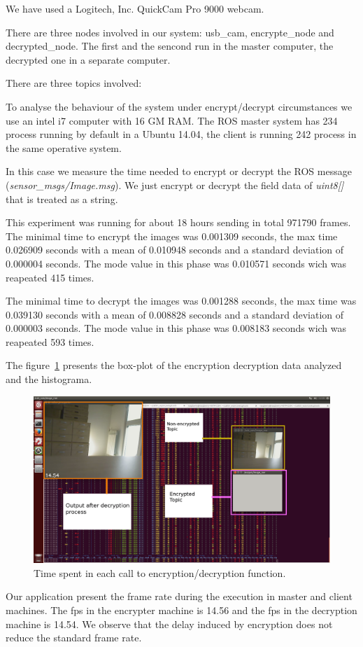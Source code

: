 \documentclass[journal,twoside]{JoPhA}
\begin{document}
We have used a Logitech, Inc. QuickCam Pro 9000 webcam.

There are three nodes involved in our system: usb\_cam, encrypte\_node and decrypted\_node. The first and the sencond run in the master computer, the decrypted one in a separate computer.

There are three topics involved: 

To analyse the behaviour of the system under encrypt/decrypt circumstances we use an intel i7 computer with 16 GM RAM. The ROS master system has 234 process running by default in a Ubuntu 14.04, the client is running 242 process in the same operative system.

In this case we measure the time needed to encrypt or decrypt the ROS message ({\em sensor\_msgs/Image.msg}). We just encrypt or decrypt the field data of {\em uint8[]} that is treated as a string.

This experiment was running for about 18 hours sending in total 971790 frames. The minimal time to encrypt the images was 0.001309 seconds, the max time  0.026909 seconds with a 
mean of  0.010948 seconds and a standard deviation of 0.000004 seconds. The mode value in this phase was 0.010571 seconds wich was reapeated 415 times. 

The minimal time to decrypt the images was 0.001288 seconds, the max time was 0.039130 seconds with a 
mean of  0.008828 seconds and a standard deviation of 0.000003 seconds. The mode value in this phase was 0.008183 seconds wich was reapeated 593 times. 


The figure~\ref{fig:graphicalRepresentation} presents the box-plot of the encryption decryption data analyzed and the histograma. 

\begin{figure}[ht]
    \centering
    \includegraphics[width=.5\textwidth]{Screenshot.png}
    \caption{Time spent in each call to encryption/decryption function.}
  \label{fig:graphicalRepresentation}
\end{figure}


Our application present the frame rate during the execution in master and client machines. The fps in the encrypter machine is 14.56 and the fps in the decryption machine is 14.54.
We observe that the delay induced by encryption does not reduce the standard frame rate. 
\end{document}
